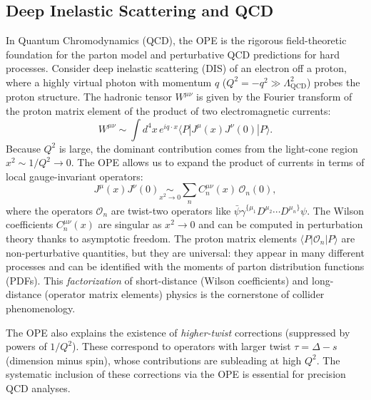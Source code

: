 \documentclass[11pt]{article}
\begin{document}
\subsection{Deep Inelastic Scattering and QCD}
\label{sec:QCD}
In Quantum Chromodynamics (QCD), the OPE is the rigorous field-theoretic foundation for the parton model and perturbative QCD predictions for hard processes. Consider deep inelastic scattering (DIS) of an electron off a proton, where a highly virtual photon with momentum $q$ ($Q^2 = -q^2 \gg \Lambda_{\text{QCD}}^2$) probes the proton structure. The hadronic tensor $W^{\mu\nu}$ is given by the Fourier transform of the proton matrix element of the product of two electromagnetic currents:
\[
W^{\mu\nu} \sim \int d^4 x \, e^{i q \cdot x} \langle P | J^\mu(x) J^\nu(0) | P \rangle .
\]
Because $Q^2$ is large, the dominant contribution comes from the light-cone region $x^2 \sim 1/Q^2 \to 0$. The OPE allows us to expand the product of currents in terms of local gauge-invariant operators:
\begin{equation}
J^\mu(x) J^\nu(0) \underset{x^2 \to 0}{\sim} \sum_{n} C_n^{\mu\nu}(x) \, \mathcal{O}_n(0),
\end{equation}
where the operators $\mathcal{O}_n$ are twist-two operators like $\bar{\psi} \gamma^{\{\mu_1} D^{\mu_2} \cdots D^{\mu_n\}} \psi$. The Wilson coefficients $C_n^{\mu\nu}(x)$ are singular as $x^2 \to 0$ and can be computed in perturbation theory thanks to asymptotic freedom. The proton matrix elements $\langle P | \mathcal{O}_n | P \rangle$ are non-perturbative quantities, but they are universal: they appear in many different processes and can be identified with the moments of parton distribution functions (PDFs). This \emph{factorization} of short-distance (Wilson coefficients) and long-distance (operator matrix elements) physics is the cornerstone of collider phenomenology.

The OPE also explains the existence of \emph{higher-twist} corrections (suppressed by powers of $1/Q^2$). These correspond to operators with larger twist $\tau = \Delta - s$ (dimension minus spin), whose contributions are subleading at high $Q^2$. The systematic inclusion of these corrections via the OPE is essential for precision QCD analyses.
\end{document}
